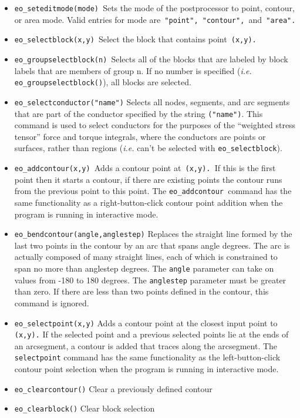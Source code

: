 \begin{itemize}
\item \texttt{eo\_seteditmode(mode) }Sets the mode of the postprocessor to point,
contour, or area mode. Valid entries for mode are\texttt{ "point",
"contour", }and\texttt{ "area". }

\item \texttt{eo\_selectblock(x,y) }Select the block that contains point\texttt{
(x,y).}

\item \texttt{eo\_groupselectblock(n) }Selects all of the blocks that are labeled by
block labels that are members of group n. If no number is specified
({\em i.e.} \texttt{eo\_groupselectblock()}), all blocks are selected.

\item \texttt{eo\_selectconductor("name")} Selects all nodes, segments, and arc
segments that are part of the conductor specified by the string
\texttt{("name")}. This command is used to select conductors for the
purposes of the ``weighted stress tensor'' force and torque
integrals, where the conductors are points or surfaces, rather than
regions ({\em i.e.} can't be selected with \texttt{eo\_selectblock}).

\item \texttt{eo\_addcontour(x,y) }Adds a contour point at\texttt{ (x,y). }If this is
the first point then it starts a contour, if there are existing
points the contour runs from the previous point to this point. The
\texttt{eo\_addcontour }command has the same functionality as a
right-button-click contour point addition when the program is
running in interactive mode.\texttt{ }

\item \texttt{eo\_bendcontour(angle,anglestep)} Replaces the straight line formed by
the last two points in the contour by an arc that spans angle
degrees. The arc is actually composed of many straight lines, each
of which is constrained to span no more than anglestep degrees. The
\texttt{angle} parameter can take on values from -180 to 180
degrees. The \texttt{anglestep} parameter must be greater than
zero. If there are less than two points defined in the contour,
this command is ignored.

\item \texttt{eo\_selectpoint(x,y)} Adds a contour point at the closest input point to
\texttt{(x,y).} If the selected point and a previous selected points lie at
the ends of an arcsegment, a contour is added that traces along the
arcsegment. The \texttt{selectpoint} command has the same
functionality as the left-button-click contour point selection when
the program is running in interactive mode.

\item \texttt{eo\_clearcontour()} Clear a previously defined contour

\item \texttt{eo\_clearblock()} Clear block selection
\end{itemize}



